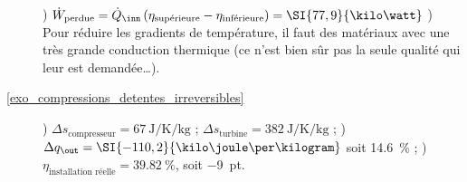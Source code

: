 \begin{description}
						) $\dot{W}_\text{perdue} = \dot Q_\inn \left(\eta_\text{supérieure} - \eta_\text{inférieure}\right) = \SI{77,9}{\kilo\watt}$
						) Pour réduire les gradients de température, il faut des matériaux avec une très grande conduction thermique (ce n’est bien sûr pas la seule qualité qui leur est demandée…).
		\item [\ref{exo_compressions_detentes_irreversibles}]
						) $\Delta s_\text{compresseur} = \SI{+67}{\joule\per\kelvin\per\kilogram}$ ; $\Delta s_\text{turbine} = \SI{+382}{\joule\per\kelvin\per\kilogram}$ ;
						) $\Delta q_\out = \SI{-110,2}{\kilo\joule\per\kilogram}$ soit \SI{+14,6}{\percent} ;
						) $\eta_\text{installation réelle} =\SI{39,82}{\percent}$, soit \SI{-9}{pt}.
	\end{description}
